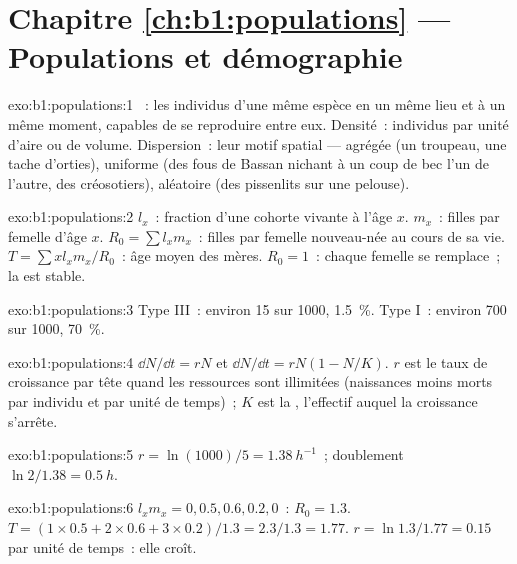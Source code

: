 \section*{Chapitre \ref{ch:b1:populations} --- Populations et démographie}

\begin{solution}{exo:b1:populations:1}
~: les individus d'une même espèce en un même lieu et à un
même moment, capables de se reproduire entre eux. Densité~: individus
par unité d'aire ou de volume. Dispersion~: leur motif spatial ---
agrégée (un troupeau, une tache d'orties), uniforme (des fous de Bassan
nichant à un coup de bec l'un de l'autre, des créosotiers), aléatoire
(des pissenlits sur une pelouse).
\end{solution}

\begin{solution}{exo:b1:populations:2}
$l_x$~: fraction d'une cohorte vivante à l'âge $x$. $m_x$~: filles par
femelle d'âge $x$. $R_0 = \sum l_x m_x$~: filles par femelle nouveau-née
au cours de sa vie. $T = \sum x l_x m_x / R_0$~: âge moyen des mères.
$R_0 = 1$~: chaque femelle se remplace~; la  est stable.
\end{solution}

\begin{solution}{exo:b1:populations:3}
Type III~: environ 15 sur 1000, \qty{1.5}{\%}. Type I~: environ 700 sur
1000, \qty{70}{\%}.
\end{solution}

\begin{solution}{exo:b1:populations:4}
$\dd N/\dd t = rN$ et $\dd N/\dd t = rN(1 - N/K)$. $r$ est le taux de
croissance par tête quand les ressources sont illimitées (naissances
moins morts par individu et par unité de temps)~; $K$ est la , l'effectif auquel la croissance s'arrête.
\end{solution}

\begin{solution}{exo:b1:populations:5}
$r = \ln(1000)/5 = \qty{1.38}{h^{-1}}$~; doublement $\ln 2/1.38 =
\qty{0.5}{h}$.
\end{solution}

\begin{solution}{exo:b1:populations:6}
$l_x m_x = 0, 0.5, 0.6, 0.2, 0$~: $R_0 = 1.3$. $T = (1\times 0.5 +
2\times 0.6 + 3\times 0.2)/1.3 = 2.3/1.3 = 1.77$. $r = \ln 1.3/1.77 =
\qty{0.15}{}$ par unité de temps~: elle croît.
\end{solution}

